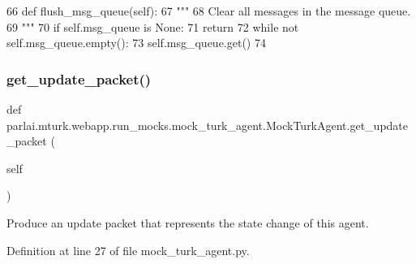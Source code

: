 \begin{DoxyCode}
66     \textcolor{keyword}{def }flush\_msg\_queue(self):
67         \textcolor{stringliteral}{"""}
68 \textcolor{stringliteral}{        Clear all messages in the message queue.}
69 \textcolor{stringliteral}{        """}
70         \textcolor{keywordflow}{if} self.msg\_queue \textcolor{keywordflow}{is} \textcolor{keywordtype}{None}:
71             \textcolor{keywordflow}{return}
72         \textcolor{keywordflow}{while} \textcolor{keywordflow}{not} self.msg\_queue.empty():
73             self.msg\_queue.get()
74 
\end{DoxyCode}
\mbox{\label{classparlai_1_1mturk_1_1webapp_1_1run__mocks_1_1mock__turk__agent_1_1MockTurkAgent_aba5ee0abf70303d9711516a1b2e02af5}} 
\subsubsection{\texorpdfstring{get\+\_\+update\+\_\+packet()}{get\_update\_packet()}}
{\footnotesize\ttfamily def parlai.\+mturk.\+webapp.\+run\+\_\+mocks.\+mock\+\_\+turk\+\_\+agent.\+Mock\+Turk\+Agent.\+get\+\_\+update\+\_\+packet (\begin{DoxyParamCaption}\item[{}]{self }\end{DoxyParamCaption})}

\begin{DoxyVerb}Produce an update packet that represents the state change of this agent.
\end{DoxyVerb}
 

Definition at line 27 of file mock\+\_\+turk\+\_\+agent.\+py.


